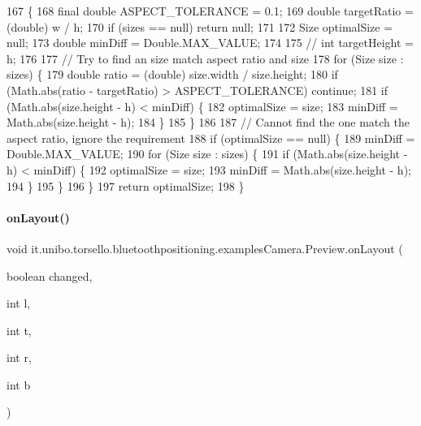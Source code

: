 \begin{DoxyCode}
167                                                                        \{
168         \textcolor{keyword}{final} \textcolor{keywordtype}{double} ASPECT\_TOLERANCE = 0.1;
169         \textcolor{keywordtype}{double} targetRatio = (double) w / h;
170         \textcolor{keywordflow}{if} (sizes == null) \textcolor{keywordflow}{return} null;
171 
172         Size optimalSize = null;
173         \textcolor{keywordtype}{double} minDiff = Double.MAX\_VALUE;
174 
175 \textcolor{comment}{//        int targetHeight = h;}
176 
177         \textcolor{comment}{// Try to find an size match aspect ratio and size}
178         \textcolor{keywordflow}{for} (Size size : sizes) \{
179             \textcolor{keywordtype}{double} ratio = (double) size.width / size.height;
180             if (Math.abs(ratio - targetRatio) > ASPECT\_TOLERANCE) \textcolor{keywordflow}{continue};
181             \textcolor{keywordflow}{if} (Math.abs(size.height - h) < minDiff) \{
182                 optimalSize = size;
183                 minDiff = Math.abs(size.height - h);
184             \}
185         \}
186 
187         \textcolor{comment}{// Cannot find the one match the aspect ratio, ignore the requirement}
188         \textcolor{keywordflow}{if} (optimalSize == null) \{
189             minDiff = Double.MAX\_VALUE;
190             \textcolor{keywordflow}{for} (Size size : sizes) \{
191                 \textcolor{keywordflow}{if} (Math.abs(size.height - h) < minDiff) \{
192                     optimalSize = size;
193                     minDiff = Math.abs(size.height - h);
194                 \}
195             \}
196         \}
197         \textcolor{keywordflow}{return} optimalSize;
198     \}
\end{DoxyCode}
\hypertarget{classit_1_1unibo_1_1torsello_1_1bluetoothpositioning_1_1examplesCamera_1_1Preview_a93af42647109198d02609680760ef465_a93af42647109198d02609680760ef465}{}\label{classit_1_1unibo_1_1torsello_1_1bluetoothpositioning_1_1examplesCamera_1_1Preview_a93af42647109198d02609680760ef465_a93af42647109198d02609680760ef465} 
\paragraph{\texorpdfstring{on\+Layout()}{onLayout()}}
{\footnotesize\ttfamily void it.\+unibo.\+torsello.\+bluetoothpositioning.\+examples\+Camera.\+Preview.\+on\+Layout (\begin{DoxyParamCaption}\item[{boolean}]{changed,  }\item[{int}]{l,  }\item[{int}]{t,  }\item[{int}]{r,  }\item[{int}]{b }\end{DoxyParamCaption})\hspace{0.3cm}{\ttfamily [protected]}}


